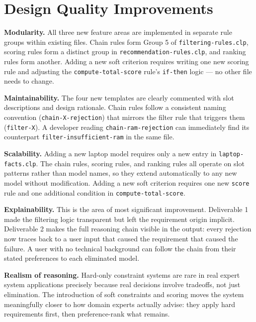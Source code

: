 \documentclass[12pt,a4paper]{article}
\begin{document}
\section{Design Quality Improvements}

\textbf{Modularity.} All three new feature areas are implemented in separate rule groups within existing files. Chain rules form Group 5 of \texttt{filtering-rules.clp}, scoring rules form a distinct group in \texttt{recommendation-rules.clp}, and ranking rules form another. Adding a new soft criterion requires writing one new scoring rule and adjusting the \texttt{compute-total-score} rule's \texttt{if-then} logic --- no other file needs to change.

\textbf{Maintainability.} The four new templates are clearly commented with slot descriptions and design rationale. Chain rules follow a consistent naming convention (\texttt{chain-X-rejection}) that mirrors the filter rule that triggers them (\texttt{filter-X}). A developer reading \texttt{chain-ram-rejection} can immediately find its counterpart \texttt{filter-insufficient-ram} in the same file.

\textbf{Scalability.} Adding a new laptop model requires only a new entry in \texttt{laptop-facts.clp}. The chain rules, scoring rules, and ranking rules all operate on slot patterns rather than model names, so they extend automatically to any new model without modification. Adding a new soft criterion requires one new \texttt{score} rule and one additional condition in \texttt{compute-total-score}.

\textbf{Explainability.} This is the area of most significant improvement. Deliverable 1 made the filtering logic transparent but left the requirement origin implicit. Deliverable 2 makes the full reasoning chain visible in the output: every rejection now traces back to a user input that caused the requirement that caused the failure. A user with no technical background can follow the chain from their stated preferences to each eliminated model.

\textbf{Realism of reasoning.} Hard-only constraint systems are rare in real expert system applications precisely because real decisions involve tradeoffs, not just elimination. The introduction of soft constraints and scoring moves the system meaningfully closer to how domain experts actually advise: they apply hard requirements first, then preference-rank what remains.
\end{document}
